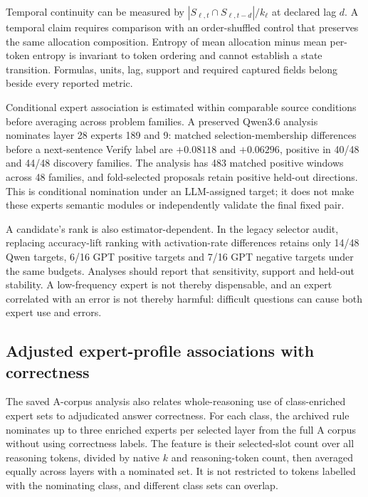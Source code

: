 Temporal continuity can be measured by
$|S_{\ell,t}\cap S_{\ell,t-d}|/k_\ell$ at declared lag $d$. A temporal claim
requires comparison with an order-shuffled control that preserves the
same allocation composition. Entropy of mean allocation minus mean
per-token entropy is invariant to token ordering and cannot establish a
state transition. Formulas, units, lag, support and required captured
fields belong beside every reported metric.

Conditional expert association is estimated within comparable source
conditions before averaging across problem families. A preserved
Qwen3.6 analysis nominates layer 28 experts 189 and 9: matched
selection-membership differences before a next-sentence Verify label are
$+0.08118$ and $+0.06296$, positive in 40/48 and 44/48 discovery families.
The analysis has 483 matched positive windows across 48 families, and
fold-selected proposals retain positive held-out directions. This is
conditional nomination under an LLM-assigned target; it does not make
these experts semantic modules or independently validate the final fixed
pair.

A candidate's rank is also estimator-dependent. In the legacy selector
audit, replacing accuracy-lift ranking with activation-rate differences
retains only 14/48 Qwen targets, 6/16 GPT positive targets and 7/16 GPT
negative targets under the same budgets. Analyses should report that
sensitivity, support and held-out stability. A low-frequency expert is
not thereby dispensable, and an expert correlated with an error is not
thereby harmful: difficult questions can cause both expert use and errors.

\subsection{Adjusted expert-profile associations with correctness}
\label{sec:adjusted-expert-associations}

The saved A-corpus analysis also relates whole-reasoning use of
class-enriched expert sets to adjudicated answer correctness. For each
class, the archived rule nominates up to three enriched experts per
selected layer from the full A corpus without using correctness labels.
The feature is their selected-slot count over all reasoning tokens,
divided by native $k$ and reasoning-token count, then averaged equally
across layers with a nominated set. It is not restricted to tokens
labelled with the nominating class, and different class sets can overlap.

